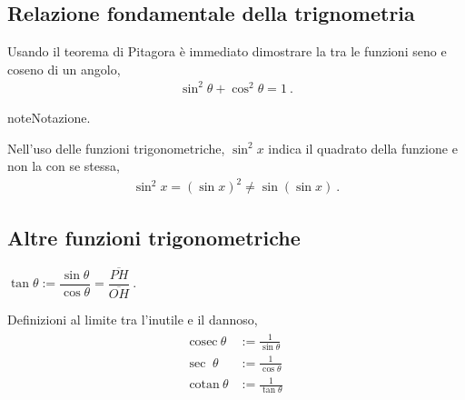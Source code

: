 \documentclass[letterpaper,10pt,italian]{jupyterBook}
\begin{document}
\subsection{Relazione fondamentale della trignometria}
\label{\detokenize{ch/trigonometry:relazione-fondamentale-della-trignometria}}\label{\detokenize{ch/trigonometry:math-hs-trigonometry-fundamental}}
\sphinxAtStartPar
Usando il teorema di Pitagora è immediato dimostrare la  tra le funzioni seno e coseno di un angolo,
\begin{equation}\label{equation:ch/trigonometry:eq:trigonometry-fundamental}
\begin{split}\sin^2 \theta + \cos^2 \theta = 1 \ .\end{split}
\end{equation}
\begin{sphinxadmonition}{note}{Notazione.}

\sphinxAtStartPar
Nell’uso delle funzioni trigonometriche, \(\sin^2 x\) indica il quadrato della funzione e non la {\hyperref[\detokenize{ch/precalculus/real-functions:math-hs-precalculus-real-functions-composite}]{}} con se stessa,
\begin{equation*}
\begin{split}\sin^2 x = (\sin x)^2 \neq \sin( \sin x) \ .\end{split}
\end{equation*}\end{sphinxadmonition}


\subsection{Altre funzioni trigonometriche}
\label{\detokenize{ch/trigonometry:altre-funzioni-trigonometriche}}
\sphinxAtStartPar
{} \(\tan \theta := \dfrac{\sin \theta}{\cos \theta} = \dfrac{\overline{PH}}{\overline{OH}} \ .\)

\sphinxAtStartPar
{} Definizioni al limite tra l’inutile e il dannoso,
\begin{equation*}
\begin{split}\begin{aligned}
  \text{cosec} \ \theta & := \frac{1}{\sin \theta} \\
  \text{sec  } \ \theta & := \frac{1}{\cos \theta} \\
  \text{cotan} \ \theta & := \frac{1}{\tan \theta} \\
\end{aligned}\end{split}
\end{equation*}
\end{document}
